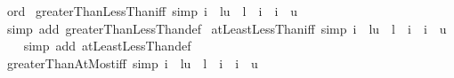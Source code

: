 \begin{isabellebody}
%
\endisadelimproof
%
\isadelimdocument
%
\endisadelimdocument
%
\isatagdocument
%
\isamarkuptrue%
%
\endisatagdocument
{\isafolddocument}%
%
\isadelimdocument
%
\endisadelimdocument
{}\isamarkupfalse%
\ ord\isanewline
{}\isanewline
\isanewline
{}\isamarkupfalse%
\ greaterThanLessThan{\isacharunderscore}{\kern0pt}iff\ {\isacharbrackleft}{\kern0pt}simp{\isacharbrackright}{\kern0pt}{\isacharcolon}{\kern0pt}\ {\isachardoublequoteopen}{\isacharparenleft}{\kern0pt}i\ {\isasymin}\ {\isacharbraceleft}{\kern0pt}l{\isacharless}{\kern0pt}{\isachardot}{\kern0pt}{\isachardot}{\kern0pt}{\isacharless}{\kern0pt}u{\isacharbraceright}{\kern0pt}{\isacharparenright}{\kern0pt}\ {\isacharequal}{\kern0pt}\ {\isacharparenleft}{\kern0pt}l\ {\isacharless}{\kern0pt}\ i\ {\isasymand}\ i\ {\isacharless}{\kern0pt}\ u{\isacharparenright}{\kern0pt}{\isachardoublequoteclose}\isanewline
%
\isadelimproof
\ \ %
\endisadelimproof
%
\isatagproof
{}\isamarkupfalse%
\ {\isacharparenleft}{\kern0pt}simp\ add{\isacharcolon}{\kern0pt}\ greaterThanLessThan{\isacharunderscore}{\kern0pt}def{\isacharparenright}{\kern0pt}%
\endisatagproof
{\isafoldproof}%
%
\isadelimproof
\isanewline
%
\endisadelimproof
\isanewline
{}\isamarkupfalse%
\ atLeastLessThan{\isacharunderscore}{\kern0pt}iff\ {\isacharbrackleft}{\kern0pt}simp{\isacharbrackright}{\kern0pt}{\isacharcolon}{\kern0pt}\ {\isachardoublequoteopen}{\isacharparenleft}{\kern0pt}i\ {\isasymin}\ {\isacharbraceleft}{\kern0pt}l{\isachardot}{\kern0pt}{\isachardot}{\kern0pt}{\isacharless}{\kern0pt}u{\isacharbraceright}{\kern0pt}{\isacharparenright}{\kern0pt}\ {\isacharequal}{\kern0pt}\ {\isacharparenleft}{\kern0pt}l\ {\isasymle}\ i\ {\isasymand}\ i\ {\isacharless}{\kern0pt}\ u{\isacharparenright}{\kern0pt}{\isachardoublequoteclose}\isanewline
%
\isadelimproof
\ \ %
\endisadelimproof
%
\isatagproof
{}\isamarkupfalse%
\ {\isacharparenleft}{\kern0pt}simp\ add{\isacharcolon}{\kern0pt}\ atLeastLessThan{\isacharunderscore}{\kern0pt}def{\isacharparenright}{\kern0pt}%
\endisatagproof
{\isafoldproof}%
%
\isadelimproof
\isanewline
%
\endisadelimproof
\isanewline
{}\isamarkupfalse%
\ greaterThanAtMost{\isacharunderscore}{\kern0pt}iff\ {\isacharbrackleft}{\kern0pt}simp{\isacharbrackright}{\kern0pt}{\isacharcolon}{\kern0pt}\ {\isachardoublequoteopen}{\isacharparenleft}{\kern0pt}i\ {\isasymin}\ {\isacharbraceleft}{\kern0pt}l{\isacharless}{\kern0pt}{\isachardot}{\kern0pt}{\isachardot}{\kern0pt}u{\isacharbraceright}{\kern0pt}{\isacharparenright}{\kern0pt}\ {\isacharequal}{\kern0pt}\ {\isacharparenleft}{\kern0pt}l\ {\isacharless}{\kern0pt}\ i\ {\isasymand}\ i\ {\isasymle}\ u{\isacharparenright}{\kern0pt}{\isachardoublequoteclose}\isanewline

\end{isabellebody}
